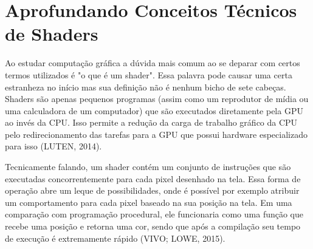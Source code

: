 \section{Aprofundando Conceitos Técnicos de Shaders}
\label{sec:aprofundando-conceitos-tecnicos-shaders}


Ao estudar computação gráfica a dúvida mais comum ao se deparar com certos termos utilizados é "o que é um shader". Essa palavra pode causar uma certa estranheza no início mas sua definição não é nenhum bicho de sete cabeças. Shaders são apenas pequenos programas (assim como um reprodutor de mídia ou uma calculadora de um computador) que são executados diretamente pela \acrshort{GPU} ao invés da \acrshort{CPU}. Isso permite a redução da carga de trabalho gráfico da \acrshort{CPU} pelo redirecionamento das tarefas para a \acrshort{GPU} que possui hardware especializado para isso (LUTEN, 2014)\nocite{openGLBook}.

	\begin{figure}[h!]
		\centering
	\end{figure}
	\nocite{figura5}

Tecnicamente falando, um shader contém um conjunto de instruções que são executadas concorrentemente para cada pixel desenhado na tela. Essa forma de operação abre um leque de possibilidades, onde é possível por exemplo atribuir um comportamento para cada pixel baseado na sua posição na tela. Em uma comparação com programação procedural, ele funcionaria como uma função que recebe uma posição e retorna uma cor, sendo que após a compilação seu tempo de execução é extremamente rápido (VIVO; LOWE, 2015)\nocite{bookOfShaders}.

